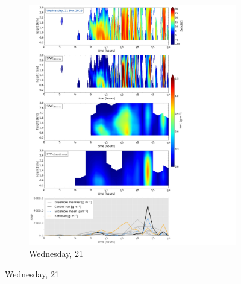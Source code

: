 \begin{figure}[h]
	\centering
	\begin{subfigure}[b]{0.8\textwidth}
		\includegraphics[trim={0.5cm 0.5cm 17.5cm .5cm},clip,width=\textwidth]{./fig_SWC/20161221}
		\caption{Wednesday, \SI{21}{\dec}}\label{fig:SWC21}
	\end{subfigure}
\end{figure}
